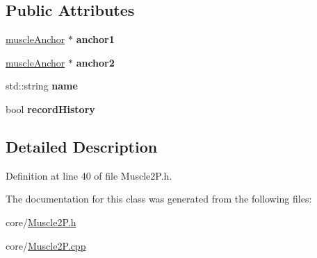 \subsection*{Public Attributes}
\begin{DoxyCompactItemize}
\item 
\hypertarget{class_muscle2_p_a1be8031d11de2f8c73325ceeb1280300}{\hyperlink{classmuscle_anchor}{muscle\-Anchor} $\ast$ {\bfseries anchor1}}\label{class_muscle2_p_a1be8031d11de2f8c73325ceeb1280300}

\item 
\hypertarget{class_muscle2_p_afc2efcadd58961f04a3792efa2159d2e}{\hyperlink{classmuscle_anchor}{muscle\-Anchor} $\ast$ {\bfseries anchor2}}\label{class_muscle2_p_afc2efcadd58961f04a3792efa2159d2e}

\item 
\hypertarget{class_muscle2_p_a65e5ea0f2393c88c31eee87c6bf69258}{std\-::string {\bfseries name}}\label{class_muscle2_p_a65e5ea0f2393c88c31eee87c6bf69258}

\item 
\hypertarget{class_muscle2_p_ae3354e6cb4e67820c7ebf0d7dd9503a1}{bool {\bfseries record\-History}}\label{class_muscle2_p_ae3354e6cb4e67820c7ebf0d7dd9503a1}

\end{DoxyCompactItemize}


\subsection{Detailed Description}


Definition at line 40 of file Muscle2\-P.\-h.



The documentation for this class was generated from the following files\-:\begin{DoxyCompactItemize}
\item 
core/\hyperlink{_muscle2_p_8h}{Muscle2\-P.\-h}\item 
core/\hyperlink{_muscle2_p_8cpp}{Muscle2\-P.\-cpp}\end{DoxyCompactItemize}
